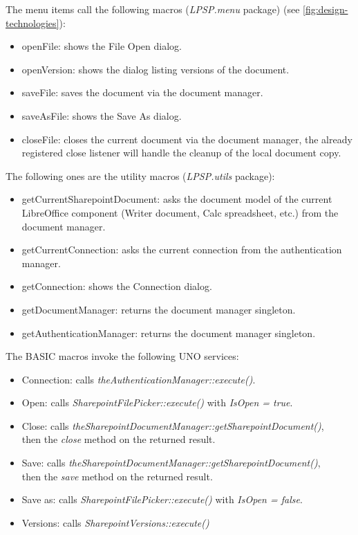 The menu items call the following macros (\emph{LPSP.menu} package) (see \autoref{fig:design-technologies}):

\begin{itemize}
\item openFile: shows the File Open dialog.
\item openVersion: shows the dialog listing versions of the document.
\item saveFile: saves the document via the document manager.
\item saveAsFile: shows the Save As dialog.
\item closeFile: closes the current document via the document manager, the
already registered close listener will handle the cleanup of the local document
copy.
\end{itemize}

The following ones are the utility macros (\emph{LPSP.utils} package):

\begin{itemize}
\item getCurrentSharepointDocument: asks the document model of the current LibreOffice component (Writer document, Calc spreadsheet, etc.) from the document manager.
\item getCurrentConnection: asks the current connection from the authentication manager.
\item getConnection: shows the Connection dialog.
\item getDocumentManager: returns the document manager singleton.
\item getAuthenticationManager: returns the document manager singleton.
\end{itemize}

The BASIC macros invoke the following UNO services:

\begin{itemize}
\item Connection: calls \emph{theAuthenticationManager::execute()}.
\item Open: calls \emph{SharepointFilePicker::execute()} with \emph{IsOpen = true}.
\item Close: calls \emph{theSharepointDocumentManager::getSharepointDocument()}, \\ then the \emph{close} method on the returned result.
\item Save: calls \emph{theSharepointDocumentManager::getSharepointDocument()}, \\ then the \emph{save} method on the returned result.
\item Save as: calls \emph{SharepointFilePicker::execute()} with \emph{IsOpen = false}.
\item Versions: calls \emph{SharepointVersions::execute()}
\end{itemize}

